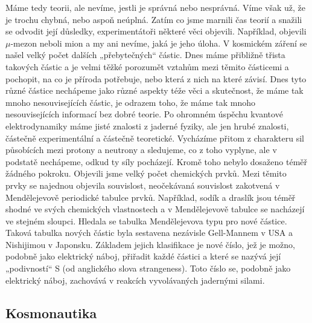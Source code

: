       Máme tedy teorii, ale nevíme, jestli je správná nebo nesprávná. Víme však už, že je trochu
      chybná, nebo aspoň neúplná. Zatím co jsme marnili čas teorií a snažili se odvodit její
      důsledky, experimentátoři některé věci objevili. Například, objevili \(\mu\text{-mezon}\)
      neboli mion a my ani nevíme, jaká je jeho úloha. V kosmickém záření se našel velký počet
      dalších „přebytečných“ částic. Dnes máme přibližně třista takových částic a je velmi těžké
      porozumět vztahům mezi těmito částicemi a pochopit, na co je příroda potřebuje, nebo která z
      nich na které závisí. Dnes tyto různé částice nechápeme jako různé aspekty téže věci a
      skutečnost, že máme tak mnoho nesouvisejících částic, je odrazem toho, že máme tak mnoho
      nesouvisejících informací bez dobré teorie. Po ohromném úspěchu kvantové elektrodynamiky máme
      jisté znalosti z jaderné fyziky, ale jen hrubé znalosti, částečně experimentální a částečně
      teoretické. Vycházíme přitom z charakteru sil působících mezi protony a neutrony a sledujeme,
      co z toho vyplyne, ale v podstatě nechápeme, odkud ty síly pocházejí. Kromě toho nebylo
      dosaženo téměř žádného pokroku. Objevili jsme velký počet chemických prvků. Mezi těmito prvky
      se najednou objevila souvislost, neočekávaná souvislost zakotvená v Mendělejevově periodické
      tabulce prvků. Například, sodík a draslík jsou téměř shodné ve svých chemických vlastnostech a
      v Mendělejevově tabulce se nacházejí ve stejném sloupci. Hledala se tabulka Mendělejevova typu
      pro nové částice. Taková tabulka nových částic byla sestavena nezávisle Gell-Mannem v USA a
      Nishijimou v Japonsku. Základem jejich klasifikace je nové číslo, jež je možno, podobně jako
      elektrický náboj, přiřadit každé částici a které se nazývá její „podivností“ S (od anglického
      slova strangeness). Toto číslo se, podobně jako elektrický náboj, zachovává v reakcích
      vyvolávaných jadernými silami.  
    
    \subsection{Kosmonautika}\label{fyz:IchapIIsecIVssecV} 
    
      
